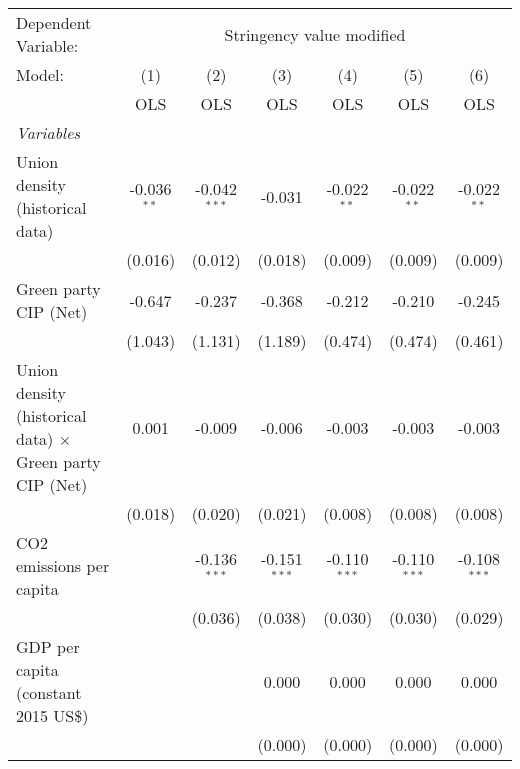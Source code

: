 
\begingroup
\centering
\begin{tabular}{lcccccc}
   \toprule
   Dependent Variable: & \multicolumn{6}{c}{Stringency value modified}\\
   Model:                                                          & (1)           & (2)            & (3)            & (4)            & (5)            & (6)\\  
                                                                   &  OLS          & OLS            & OLS            & OLS            & OLS            & OLS\\  
   \midrule
   \emph{Variables}\\
   Union density (historical data)                                 & -0.036$^{**}$ & -0.042$^{***}$ & -0.031         & -0.022$^{**}$  & -0.022$^{**}$  & -0.022$^{**}$\\   
                                                                   & (0.016)       & (0.012)        & (0.018)        & (0.009)        & (0.009)        & (0.009)\\   
   Green party CIP (Net)                                           & -0.647        & -0.237         & -0.368         & -0.212         & -0.210         & -0.245\\   
                                                                   & (1.043)       & (1.131)        & (1.189)        & (0.474)        & (0.474)        & (0.461)\\   
   Union density (historical data) $\times$ Green party CIP (Net)  & 0.001         & -0.009         & -0.006         & -0.003         & -0.003         & -0.003\\   
                                                                   & (0.018)       & (0.020)        & (0.021)        & (0.008)        & (0.008)        & (0.008)\\   
   CO2 emissions per capita                                        &               & -0.136$^{***}$ & -0.151$^{***}$ & -0.110$^{***}$ & -0.110$^{***}$ & -0.108$^{***}$\\   
                                                                   &               & (0.036)        & (0.038)        & (0.030)        & (0.030)        & (0.029)\\   
   GDP per capita (constant 2015 US\$)                             &               &                & 0.000          & 0.000          & 0.000          & 0.000\\   
                                                                   &               &                & (0.000)        & (0.000)        & (0.000)        & (0.000)\\   

\end{tabular}
